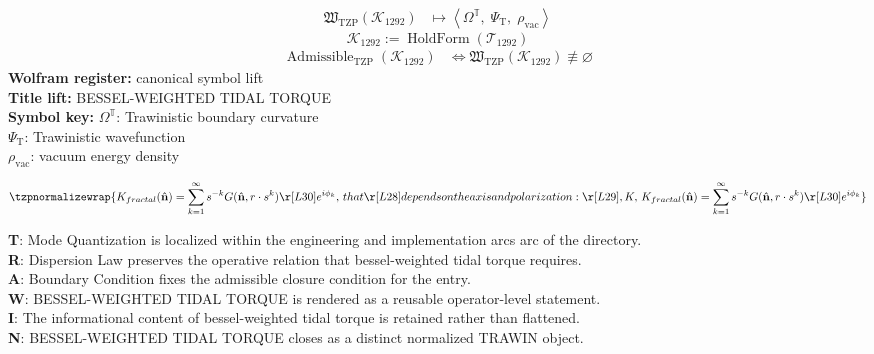 \noindent
\begin{minipage}[t]{0.48\linewidth}
\begingroup
\small
\[
\begin{aligned}
\mathfrak{W}_{\mathrm{TZP}}\!\left(\mathcal{K}_{1292}\right)
&\longmapsto
\left\langle \Omega^{\mathbb{T}},\; \Psi_{\mathrm{T}},\; \rho_{\mathrm{vac}} \right\rangle
\end{aligned}
\]
\[
\mathcal{K}_{1292}
:=
\operatorname{HoldForm}\!\left(\mathcal{T}_{1292}\right)
\]
\[
\begin{aligned}
\operatorname{Admissible}_{\mathrm{TZP}}\!\left(\mathcal{K}_{1292}\right)
&\Longleftrightarrow
\mathfrak{W}_{\mathrm{TZP}}\!\left(\mathcal{K}_{1292}\right)\not\equiv\varnothing
\end{aligned}
\]
\textbf{Wolfram register:} canonical symbol lift\\
\textbf{Title lift:} BESSEL-WEIGHTED TIDAL TORQUE\\
\textbf{Symbol key:} \(\Omega^{\mathbb{T}}\): Trawinistic boundary curvature\\ \(\Psi_{\mathrm{T}}\): Trawinistic wavefunction\\ \(\rho_{\mathrm{vac}}\): vacuum energy density
\par
\endgroup
\end{minipage}\hfill
\begin{minipage}[t]{0.48\linewidth}
\[
\tzpnormalizewrap{K_{fractal}(\hat{\mathbf{n}}) = \sum_{k=1}^{\infty} s^{-k} G(\hat{\mathbf{n}}, r \cdot s^k)\r [L30] e^{i\phi_k},\,that\r [L28] depends on the axis and polarization:\r [L29],K,\,K_{fractal}(\hat{\mathbf{n}}) = \sum_{k=1}^{\infty} s^{-k} G(\hat{\mathbf{n}}, r \cdot s^k)\r [L30] e^{i\phi_k}}
\]

\small
\textbf{T}: Mode Quantization is localized within the engineering and implementation arcs arc of the directory.\\
\textbf{R}: Dispersion Law preserves the operative relation that bessel-weighted tidal torque requires.\\
\textbf{A}: Boundary Condition fixes the admissible closure condition for the entry.\\
\textbf{W}: BESSEL-WEIGHTED TIDAL TORQUE is rendered as a reusable operator-level statement.\\
\textbf{I}: The informational content of bessel-weighted tidal torque is retained rather than flattened.\\
\textbf{N}: BESSEL-WEIGHTED TIDAL TORQUE closes as a distinct normalized TRAWIN object.
\normalsize
\end{minipage}

